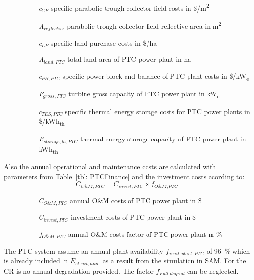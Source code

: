 \documentclass[Master,MEE,english]{twbook}%
\begin{document}
\begin{itemize}
\item[ ] 
\begin{itemize}
\item[ ] 
\begin{itemize}
\item[$c_{CF}$]specific parabolic trough collector field costs in \$/m\textsuperscript{2}
\item[$A_{reflective}$]parabolic trough collector field reflective area in m\textsuperscript{2}
\item[$c_{LP}$]specific land purchase costs in \$/ha
\item[$A_{land,PTC}$]total land area of PTC power plant in ha
\item[$c_{PB,PTC}$]specific power block and balance of PTC plant costs in \$/kW\textsubscript{e}
\item[$P_{gross,PTC}$]turbine gross capacity of PTC power plant in kW\textsubscript{e}
\item[$c_{TES,PTC}$]specific thermal energy storage costs for PTC power plants in \$/kWh\textsubscript{th}
\item[$E_{storage,th,PTC}$]thermal energy storage capacity of PTC power plant in kWh\textsubscript{th}
\end{itemize}
\end{itemize}
\end{itemize}
Also the annual operational and maintenance costs are calculated with parameters from Table~\ref{tbl: PTCFinance} and the investment costs acording to:
\begin{equation}
C_{O\&M,PTC} = C_{invest,PTC} \times f_{O\&M,PTC}
\end{equation} 
\begin{itemize}
\item[ ] 
\begin{itemize}
\item[ ] 
\begin{itemize}
\item[$C_{O\&M,PTC}$]annual O\&M costs of PTC power plant in \$
\item[$C_{invest,PTC}$]investment costs of PTC power plant in \$
\item[$f_{O\&M,PTC}$]annual O\&M costs factor of PTC power plant in \%
\end{itemize}
\end{itemize}
\end{itemize}
The PTC system assume an annual plant availability $f_{avail,plant,PTC}$ of 96~\% which is already included in $E_{el,net,ann.}$ as a result from the simulation in SAM. For the CR is no annual degradation provided. The factor $f_{Full,degrad}$ can be neglected.
\end{document}
